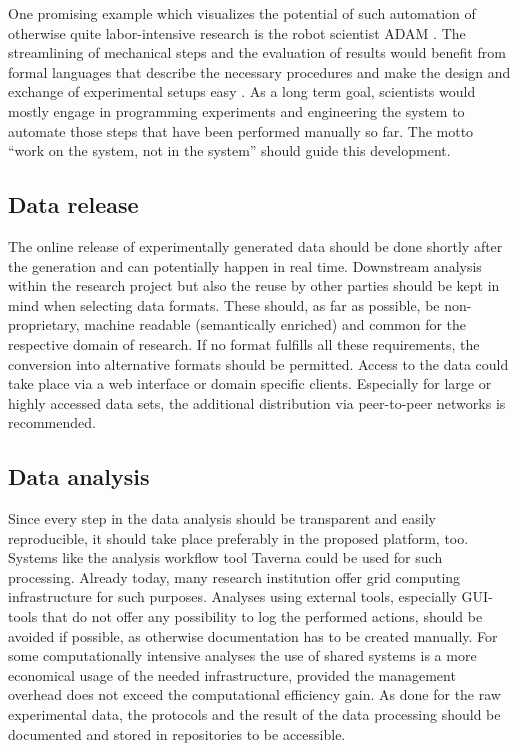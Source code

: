 \documentclass{llncs}
\begin{document}
One promising example which visualizes the potential of such
automation of otherwise quite labor-intensive research is the robot
scientist ADAM \cite{King}. The streamlining of mechanical steps and
the evaluation of results would benefit from formal languages that
describe the necessary procedures and make the design and exchange of
experimental setups easy \cite{Soldatova}. As a long term goal,
scientists would mostly engage in programming experiments and
engineering the system to automate those steps that have been
performed manually so far. The motto ``work on the system, not in the
system'' should guide this development.

\subsection{Data release}

The online release of experimentally generated data should be done
shortly after the generation and can potentially happen in real
time. Downstream analysis within the research project but also the
reuse by other parties should be kept in mind when selecting data
formats. These should, as far as possible, be non-proprietary, machine
readable (semantically enriched) and common for the respective domain
of research. If no format fulfills all these requirements, the
conversion into alternative formats should be permitted. Access to the
data could take place via a web interface or domain specific
clients. Especially for large or highly accessed data sets, the
additional distribution via peer-to-peer networks is recommended.

\subsection{Data analysis}

Since every step in the data analysis should be transparent and easily
reproducible, it should take place preferably in the proposed
platform, too. Systems like the analysis workflow tool Taverna
\cite{Hull} could be used for such processing. Already today, many
research institution offer grid computing infrastructure for such
purposes. Analyses using external tools, especially GUI-tools that do
not offer any possibility to log the performed actions, should be
avoided if possible, as otherwise documentation has to be created
manually. For some computationally intensive analyses the use of
shared systems is a more economical usage of the needed
infrastructure, provided the management overhead does not exceed the
computational efficiency gain. As done for the raw experimental data,
the protocols and the result of the data processing should be
documented and stored in repositories to be accessible.
\end{document}
